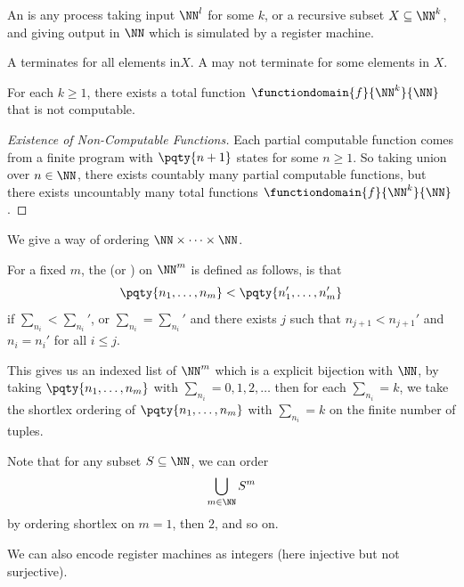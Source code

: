 \begin{definition}[Algorithm]
    An  is any process taking input \(\NN^l\) for some \(k\), or a recursive subset \(X \subseteq \NN^k\), and giving output in \(\NN\) which is simulated by a register machine.

    A  terminates for all elements in\(X\). A  may not terminate for some elements in \(X\).
\end{definition}

\begin{lemma}
    For each \(k \geq 1\), there exists a total function \(\functiondomain{f}{\NN^k}{\NN}\) that is not computable.
\end{lemma}

\begin{proof}[Existence of Non-Computable Functions]
    Each partial computable function comes from a finite program with \(\pqty{n + 1}\) states for some \(n \geq 1\). So taking union over \(n \in \NN\), there exists countably many partial computable functions, but there exists uncountably many total functions \(\functiondomain{f}{\NN^k}{\NN}\).
\end{proof}

We give a way of ordering \(\NN \times \cdots \times \NN\).

\begin{definition}
    For a fixed \(m\), the  (or )  on \(\NN^m\) is defined as follows, is that
    \[
        \pqty{n_1, \ldots, n_m} < \pqty{n_1', \ldots, n_m'}
    \]
    if \(\sum_{n_i} < \sum_{n_i}'\), or \(\sum_{n_i} = \sum_{n_i}'\) and there exists \(j\) such that \(n_{j + 1} < n_{j + 1}'\) and \(n_i = n_i'\) for all \(i \leq j\).
\end{definition}

This gives us an indexed list of \(\NN^m\) which is a explicit bijection with \(\NN\), by taking \(\pqty{n_1, \ldots, n_m}\) with \(\sum_{n_i} = 0, 1, 2, \ldots\) then for each \(\sum_{n_i} = k\), we take the shortlex ordering of \(\pqty{n_1, \ldots, n_m}\) with \(\sum_{n_i} = k\) on the finite number of tuples.

Note that for any subset \(S \subseteq \NN\), we can order
\[
    \bigcup_{m \in \NN} S^m
\]
by ordering shortlex on \(m = 1\), then \(2\), and so on.

We can also encode register machines as integers (here injective but not surjective).

